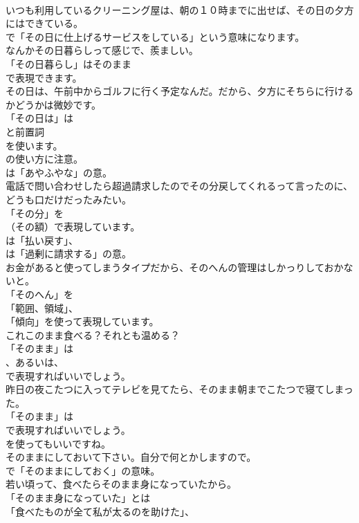 \documentclass[8pt]{extreport}
\begin{document}
\begin{CJK}{UTF8}{min}
\\	いつも利用しているクリーニング屋は、朝の１０時までに出せば、その日の夕方にはできている。 
\\	で「その日に仕上げるサービスをしている」という意味になります。	
\\	なんかその日暮らしって感じで、羨ましい。 
\\	「その日暮らし」はそのまま
\\	で表現できます。	
\\	その日は、午前中からゴルフに行く予定なんだ。だから、夕方にそちらに行けるかどうかは微妙です。 
\\	「その日は」は 
\\	と前置詞 
\\	を使います。
\\	の使い方に注意。
\\	は「あやふやな」の意。	
\\	電話で問い合わせしたら超過請求したのでその分戻してくれるって言ったのに、どうも口だけだったみたい。 
\\	「その分」を 
\\	（その額）で表現しています。
\\	は「払い戻す」、
\\	は「過剰に請求する」の意。	
\\	お金があると使ってしまうタイプだから、そのへんの管理はしかっりしておかないと。 
\\	「そのへん」を
\\	「範囲、領域」、
\\	「傾向」を使って表現しています。	
\\	これこのまま食べる？それとも温める？ 
\\	「そのまま」は
\\	、あるいは、
\\	で表現すればいいでしょう。	
\\	昨日の夜こたつに入ってテレビを見てたら、そのまま朝までこたつで寝てしまった。 
\\	「そのまま」は 
\\	で表現すればいいでしょう。
\\	を使ってもいいですね。	
\\	そのままにしておいて下さい。自分で何とかしますので。 
\\	で「そのままにしておく」の意味。	
\\	若い頃って、食べたらそのまま身になっていたから。 
\\	「そのまま身になっていた」とは
\\	「食べたものが全て私が太るのを助けた」、

\end{CJK}
\end{document}
